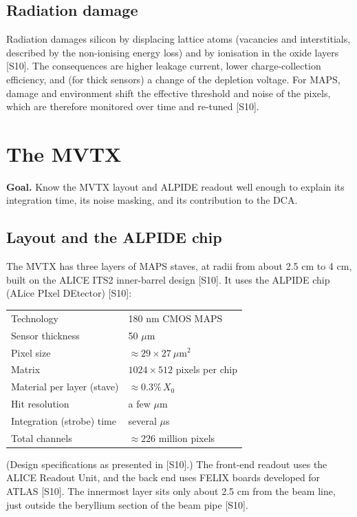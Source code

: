 \documentclass[11pt,letterpaper]{article}
\newcommand{\goal}[1]{\par\noindent\textbf{Goal.} #1\par\smallskip}
\begin{document}
\subsection{Radiation damage}
Radiation damages silicon by displacing lattice atoms (vacancies and interstitials, described by the non-ionising energy loss) and by ionisation in the oxide layers [S10].
The consequences are higher leakage current, lower charge-collection efficiency, and (for thick sensors) a change of the depletion voltage.
For MAPS, damage and environment shift the effective threshold and noise of the pixels, which are therefore monitored over time and re-tuned [S10].

\section{The MVTX}\label{sec:mvtx}
\goal{Know the MVTX layout and ALPIDE readout well enough to explain its integration time, its noise masking, and its contribution to the DCA.}

\subsection{Layout and the ALPIDE chip}
The MVTX has three layers of MAPS staves, at radii from about 2.5 cm to 4 cm, built on the ALICE ITS2 inner-barrel design [S10].
It uses the ALPIDE chip (ALice PIxel DEtector) [S10]:
\begin{center}\small
\begin{tabular}{@{}ll@{}}\toprule
Technology & 180 nm CMOS MAPS\\
Sensor thickness & 50 $\mu$m\\
Pixel size & $\approx29\times27\ \mu$m$^2$\\
Matrix & $1024\times512$ pixels per chip\\
Material per layer (stave) & $\approx0.3\%\,X_0$\\
Hit resolution & a few $\mu$m\\
Integration (strobe) time & several $\mu$s\\
Total channels & $\approx226$ million pixels\\\bottomrule
\end{tabular}\end{center}
(Design specifications as presented in [S10].)
The front-end readout uses the ALICE Readout Unit, and the back end uses FELIX boards developed for ATLAS [S10].
The innermost layer sits only about 2.5 cm from the beam line, just outside the beryllium section of the beam pipe [S10].
\end{document}
